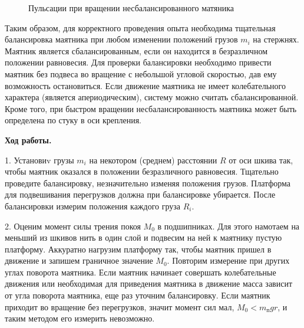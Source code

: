 \documentclass[14pt]{article}
\begin{document}
\begin{figure}[h!]
	\caption{Пульсации при вращении несбалансированного матяника}
	\label{fig:image}
\end{figure} 

Таким образом, для корректного проведения опыта необходима тщательная балансировка маятника при любом изменении положений грузов $m_i$ на стержнях. Маятник является сбалансированным, если он находится в безразличном положении равновесия. Для проверки балансировки необходимо привести маятник без подвеса во вращение с небольшой угловой скоростью, дав ему возможность остановиться. Если движение маятника не имеет колебательного характера (является апериодическим), систему можно считать сбалансированной. Кроме того, при быстром вращении несбалансированность маятника может быть определена по стуку в оси крепления.

\vspace{1cm}
\textbf{Ход работы.}

\vspace{1cm}
1. Установиv грузы $m_i$ на некотором (среднем) расстоянии $R$ от оси шкива так, чтобы маятник оказался в положении безразличного равновесия. Тщательно проведите балансировку, незначительно изменяя положения грузов. Платформа для подвешивания перегрузков должна при балансировке убирается. После балансировки измерим положения каждого груза $R_i$.

2. Оценим момент силы трения покоя $M_0$ в подшипниках. Для этого намотаем на меньший из шкивов нить в один слой и подвесим на ней к маятнику пустую платформу. Аккуратно нагрузим платформу так, чтобы маятник пришел в движение и запишем граничное значение $M_0$. Повторим измерение при других углах поворота маятника. Если маятник начинает совершать колебательные движения или необходимая для приведения маятника в движение масса зависит от угла поворота маятника, еще раз уточним балансировку. Если маятник приходит во вращение без перегрузков, значит момент
сил мал, $M_0 < m_\text{п}gr$, и таким методом его измерить невозможно.
\end{document}
